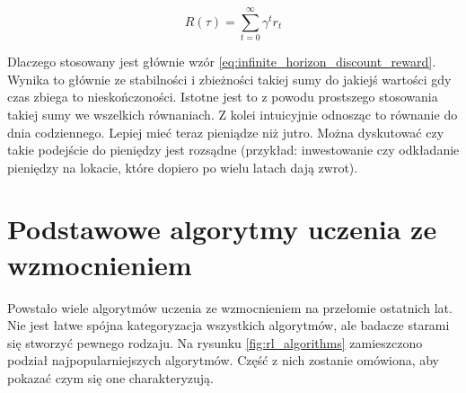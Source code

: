 \begin{equation}
	R(\tau)=\sum_{t=0}^{\infty} \gamma^tr_t
	\label{eq:infinite_horizon_discount_reward}
\end{equation}	

Dlaczego stosowany jest głównie wzór \ref{eq:infinite_horizon_discount_reward}. 
Wynika to głównie ze stabilności i zbieżności takiej sumy do jakiejś wartości 
gdy czas zbiega to nieskończoności. Istotne jest to z powodu prostszego 
stosowania takiej sumy we wszelkich równaniach. Z kolei intuicyjnie odnosząc to 
równanie do dnia codziennego. Lepiej mieć teraz pieniądze niż jutro. Można 
dyskutować czy takie podejście do pieniędzy jest rozsądne (przykład: 
inwestowanie czy odkładanie pieniędzy na lokacie, które dopiero po wielu latach 
dają zwrot).

\section{Podstawowe algorytmy uczenia ze wzmocnieniem}

Powstało wiele algorytmów uczenia ze wzmocnieniem na przełomie ostatnich lat. 
Nie jest łatwe spójna kategoryzacja wszystkich algorytmów, ale badacze starami 
się stworzyć pewnego rodzaju. Na rysunku \ref{fig:rl_algorithms} zamieszczono 
podział najpopularniejszych algorytmów. Część z nich zostanie omówiona, aby 
pokazać czym się one charakteryzują.





